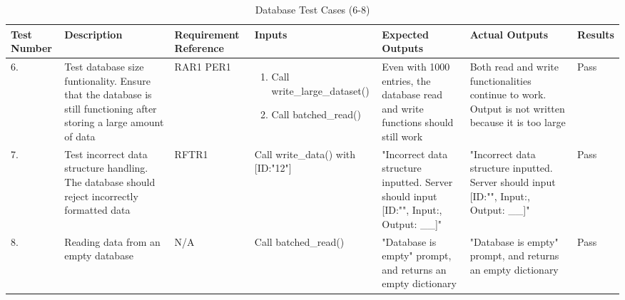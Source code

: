 \documentclass[12pt, titlepage]{article}
\begin{document}
\begin{center}
    \begin{table}[H]
        \centering
        \begin{tabular}{|p{1cm}|p{2.2cm}|p{2.5cm}|p{2.7cm}|p{2.4cm}|p{2.4cm}|p{1.3cm}|}
        \hline
        \bf Test Number & \bf Description & \bf Requirement Reference & \bf Inputs & \bf Expected Outputs & \bf Actual Outputs & \bf Results \\
        \hline
        6. & Test database size funtionality. Ensure that the database is still functioning after storing a large amount of data & RAR1 \newline PER1 & \begin{enumerate}
            \item Call write\_lar\newline ge\_\newline dataset()
            \item Call batched\_\newline read()
        \end{enumerate} & Even with 1000 entries, the database read and write functions should still work & Both read and write functionalities continue to work. Output is not written because it is too large & Pass\\
        \hline
        7. & Test incorrect data structure handling. The database should reject incorrectly formatted data & RFTR1 & Call write\_data() with [ID:"12"] & "Incorrect data structure inputted. Server should input [ID:"", Input:{}, Output: \_\_]" & "Incorrect data structure inputted. Server should input [ID:"", Input:{}, Output: \_\_]" & Pass\\
        \hline
        8. & Reading data from an empty database & N/A & Call batched\_read() & "Database is empty" prompt, and returns an empty dictionary & "Database is empty" prompt, and returns an empty dictionary & Pass\\
        \hline
        \end{tabular}
        \caption{Database Test Cases (6-8)}
        \label{tab:my_label14}
    \end{table}
\end{center}
\end{document}
